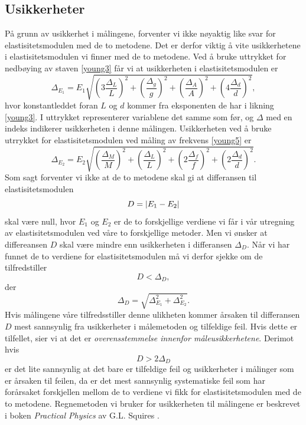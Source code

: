 \documentclass[%
 reprint,
 amsmath,amssymb,
 aps,
 norsk,
 booktabs
]{revtex4-1}
\begin{document}
\subsection{Usikkerheter}
På grunn av usikkerhet i målingene, forventer vi ikke nøyaktig like svar for elastisitetsmodulen med de to metodene. Det er derfor viktig å vite usikkerhetene i elastisitetsmodulen vi finner med de to metodene. Ved å bruke uttrykket for nedbøying av staven \eqref{young3} får vi at usikkerheten i elastisitetsmodulen er
\begingroup\makeatletter\def\f@size{7.5}\check@mathfonts
\begin{equation}
  \Delta_{E_1} = E_1 \sqrt{\left(3\frac{\Delta_L}{L}\right)^2+\left(\frac{\Delta_g}{g}\right)^2+\left(\frac{\Delta_A}{A}\right)^2+\left(4\frac{\Delta_d}{d}\right)^2},\label{uncertenty1}
\end{equation}
\endgroup
hvor konstantleddet foran $L$ og $d$ kommer fra eksponenten de har i likning \eqref{young3}. I uttrykket representerer variablene det samme som før, og $\Delta$ med en indeks indikerer usikkerheten i denne målingen.
Usikkerheten ved å bruke utrrykket for elastisitetsmodulen ved måling av frekvens \eqref{young5} er
\begingroup\makeatletter\def\f@size{7.5}\check@mathfonts
\begin{equation}
  \Delta_{E_2} = E_2 \sqrt{\left(\frac{\Delta_M}{M}\right)^2+\left(\frac{\Delta_L}{L}\right)^2+\left(2\frac{\Delta_f}{f}\right)^2+\left(2\frac{\Delta_d}{d}\right)^2}. \label{uncertenty2}
\end{equation}
\endgroup
Som sagt forventer vi ikke at de to metodene skal gi at differansen til elastisitetsmodulen $$D=\abs{E_1-E_2}$$ skal være null, hvor $E_1$ og $E_2$ er de to forskjellige verdiene vi får i vår utregning av elastisitetsmodulen ved våre to forskjellige metoder. Men vi ønsker at differeansen $D$ skal være mindre enn usikkerheten i differansen $\Delta_D$. Når vi har funnet de to verdiene for elastisitetsmodulen må vi derfor sjekke om de tilfredstiller
\begin{equation}
  D < \Delta_D, \label{usikk1}
\end{equation}
der
\begin{equation}
  \Delta_D = \sqrt{\Delta_{E_1}^2 + \Delta_{E_2}^2}. \label{usikk2}
\end{equation}
Hvis målingene våre tilfredsstiller denne ulikheten kommer årsaken til differansen $D$ mest sannsynlig fra usikkerheter i målemetoden og tilfeldige feil. Hvis dette er tilfellet, sier vi at det er
\textit{overensstemmelse innenfor måleusikkerhetene}.
Derimot hvis
\begin{equation}
  D > 2\Delta_D
\end{equation}
er det lite sannsynlig at det bare er tilfeldige feil og usikkerheter i målinger som er årsaken til feilen, da er det mest sannsynlig systematiske feil som har forårsaket forskjellen mellom de to verdiene vi fikk for elastisitetsmodulen med de to metodene. Regnemetoden vi bruker for usikkerheten til målingene er beskrevet i boken \textit{Practical Physics} av G.L. Squires \cite{squires}.
\end{document}
